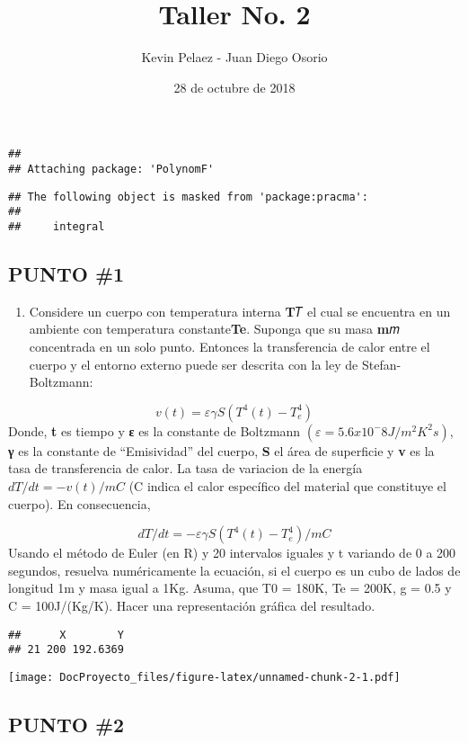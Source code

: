 \documentclass[]{article}
\title{Taller No. 2}
\author{Kevin Pelaez - Juan Diego Osorio}
\date{28 de octubre de 2018}
\providecommand{\tightlist}{%
  \setlength{\itemsep}{0pt}\setlength{\parskip}{0pt}}
\begin{document}
\maketitle

\begin{verbatim}
## 
## Attaching package: 'PolynomF'
\end{verbatim}

\begin{verbatim}
## The following object is masked from 'package:pracma':
## 
##     integral
\end{verbatim}

\subsection{PUNTO \#1}\label{punto-1}

\begin{enumerate}
\def\labelenumi{\arabic{enumi}.}
\tightlist
\item
  Considere un cuerpo con temperatura interna \textbf{T}𝑇 el cual se
  encuentra en un ambiente con temperatura constante\textbf{Te}. Suponga
  que su masa \textbf{m}𝑚 concentrada en un solo punto. Entonces la
  transferencia de calor entre el cuerpo y el entorno externo puede ser
  descrita con la ley de Stefan-Boltzmann:
\end{enumerate}

\[
v(t) = εγS(T^4(t)-T_e^4) 
\] Donde, \textbf{t} es tiempo y \textbf{ε} es la constante de Boltzmann
\((ε = 5.6x10^-8 J/m^2K^2s)\), \textbf{γ} es la constante de
``Emisividad'' del cuerpo, \textbf{S} el área de superficie y \textbf{v}
es la tasa de transferencia de calor. La tasa de variacion de la energía
\(dT/dt = -v(t)/mC\) (C indica el calor específico del material que
constituye el cuerpo). En consecuencia,

\[
dT/dt = -εγS(T^4(t)-T_e^4)/mC
\] Usando el método de Euler (en R) y 20 intervalos iguales y t variando
de 0 a 200 segundos, resuelva numéricamente la ecuación, si el cuerpo es
un cubo de lados de longitud 1m y masa igual a 1Kg. Asuma, que T0 =
180K, Te = 200K, g = 0.5 y C = 100J/(Kg/K). Hacer una representación
gráfica del resultado.

\begin{verbatim}
##      X        Y
## 21 200 192.6369
\end{verbatim}

\texttt{[image: DocProyecto\_files/figure-latex/unnamed-chunk-2-1.pdf]}

\subsection{PUNTO \#2}\label{punto-2}
\end{document}

